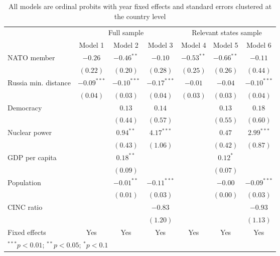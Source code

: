 
\begin{table}[h]
\begin{center}
\begin{tabular}{l c c c c c c}
\hline
 & \multicolumn{3}{c}{Full sample} & \multicolumn{3}{c}{Relevant states sample} \\
\cline{2-4} \cline{5-7}
 & Model 1 & Model 2 & Model 3 & Model 4 & Model 5 & Model 6 \\
\hline
NATO member          & $-0.26$       & $-0.46^{**}$  & $-0.10$       & $-0.53^{**}$ & $-0.66^{**}$ & $-0.11$       \\
                     & $(0.22)$      & $(0.20)$      & $(0.28)$      & $(0.25)$     & $(0.26)$     & $(0.44)$      \\
Russia min. distance & $-0.09^{***}$ & $-0.10^{***}$ & $-0.17^{***}$ & $-0.01$      & $-0.04$      & $-0.10^{***}$ \\
                     & $(0.04)$      & $(0.03)$      & $(0.04)$      & $(0.03)$     & $(0.03)$     & $(0.04)$      \\
Democracy            &               & $0.13$        & $0.14$        &              & $0.13$       & $0.18$        \\
                     &               & $(0.44)$      & $(0.57)$      &              & $(0.55)$     & $(0.60)$      \\
Nuclear power        &               & $0.94^{**}$   & $4.17^{***}$  &              & $0.47$       & $2.99^{***}$  \\
                     &               & $(0.43)$      & $(1.06)$      &              & $(0.42)$     & $(0.87)$      \\
GDP per capita       &               & $0.18^{**}$   &               &              & $0.12^{*}$   &               \\
                     &               & $(0.09)$      &               &              & $(0.07)$     &               \\
Population           &               & $-0.01^{**}$  & $-0.11^{***}$ &              & $-0.00$      & $-0.09^{***}$ \\
                     &               & $(0.01)$      & $(0.03)$      &              & $(0.00)$     & $(0.03)$      \\
CINC ratio           &               &               & $-0.83$       &              &              & $-0.93$       \\
                     &               &               & $(1.20)$      &              &              & $(1.13)$      \\
\hline
Fixed effects        & Yes           & Yes           & Yes           & Yes          & Yes          & Yes           \\
\hline
\multicolumn{7}{l}{\scriptsize{$^{***}p<0.01$; $^{**}p<0.05$; $^{*}p<0.1$}}
\end{tabular}
\caption{All models are ordinal probits with year fixed effects and standard errors clustered at the country level}
\label{table:model}
\end{center}
\end{table}

